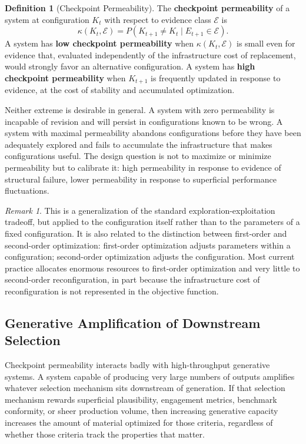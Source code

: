 \documentclass[11pt,a4paper]{article}
\theoremstyle{plain}
\theoremstyle{definition}
\newtheorem{definition}[theorem]{Definition}
\theoremstyle{remark}
\newtheorem{remark}[theorem]{Remark}
\begin{document}
\begin{definition}[Checkpoint Permeability]
The \textbf{checkpoint permeability} of a system at configuration $K_t$ with respect to evidence class $\mathcal{E}$ is
\[
\kappa(K_t, \mathcal{E}) = P(K_{t+1} \neq K_t \mid E_{t+1} \in \mathcal{E}).
\]
A system has \textbf{low checkpoint permeability} when $\kappa(K_t, \mathcal{E})$ is small even for evidence that, evaluated independently of the infrastructure cost of replacement, would strongly favor an alternative configuration. A system has \textbf{high checkpoint permeability} when $K_{t+1}$ is frequently updated in response to evidence, at the cost of stability and accumulated optimization.
\end{definition}

Neither extreme is desirable in general. A system with zero permeability is incapable of revision and will persist in configurations known to be wrong. A system with maximal permeability abandons configurations before they have been adequately explored and fails to accumulate the infrastructure that makes configurations useful. The design question is not to maximize or minimize permeability but to calibrate it: high permeability in response to evidence of structural failure, lower permeability in response to superficial performance fluctuations.

\begin{remark}
This is a generalization of the standard exploration-exploitation tradeoff, but applied to the configuration itself rather than to the parameters of a fixed configuration. It is also related to the distinction between first-order and second-order optimization: first-order optimization adjusts parameters within a configuration; second-order optimization adjusts the configuration. Most current practice allocates enormous resources to first-order optimization and very little to second-order reconfiguration, in part because the infrastructure cost of reconfiguration is not represented in the objective function.
\end{remark}

\subsection{Generative Amplification of Downstream Selection}

Checkpoint permeability interacts badly with high-throughput generative systems. A system capable of producing very large numbers of outputs amplifies whatever selection mechanism sits downstream of generation. If that selection mechanism rewards superficial plausibility, engagement metrics, benchmark conformity, or sheer production volume, then increasing generative capacity increases the amount of material optimized for those criteria, regardless of whether those criteria track the properties that matter.
\end{document}
